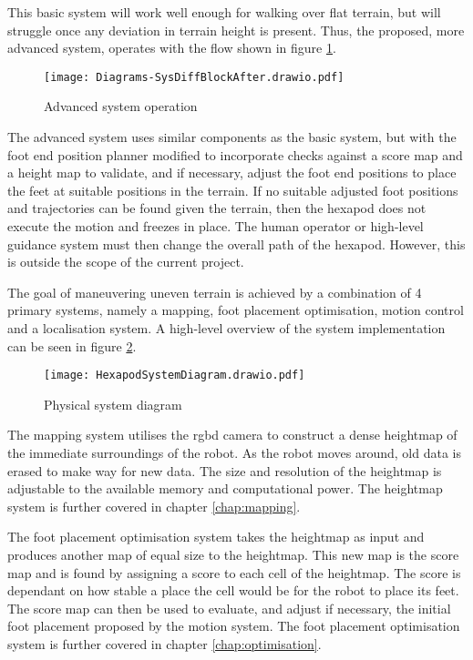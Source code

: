 \noindent
This basic system will work well enough for walking over flat terrain, but will struggle once any
deviation in terrain height is present. Thus, the proposed, more advanced system, operates with the flow shown in figure \ref{fig:adv_sys}.
\begin{figure}[h]
    \centering
    \texttt{[image: Diagrams-SysDiffBlockAfter.drawio.pdf]}
    \caption{Advanced system operation}
    \label{fig:adv_sys}
\end{figure}

\noindent
The advanced system uses similar components as the basic system, but with the foot end position planner modified to incorporate
checks against a score map and a height map to validate, and if necessary, adjust the foot 
end positions to place the feet at suitable positions in the  terrain. If no suitable adjusted foot positions and trajectories
can be found given the terrain, then the hexapod does not execute the motion and freezes in place. The human operator or
high-level guidance system must then change the overall path of the hexapod. However, this is outside the scope of the current
project.

The goal of maneuvering uneven terrain is achieved by a combination of 4 primary systems, namely a mapping, 
foot placement optimisation, motion control and a localisation system. A high-level overview of the system implementation can be seen
in figure \ref{fig:system_diagram}.
\begin{figure}[h]
    \centering
    \texttt{[image: HexapodSystemDiagram.drawio.pdf]}
    \caption{Physical system diagram}
    \label{fig:system_diagram}
\end{figure}

The mapping system utilises the \ac*{rgbd} camera to construct a dense heightmap of the immediate surroundings of the robot. As the robot moves around, old data is erased to make way for new data. The size and resolution of the heightmap is adjustable to the available memory and computational power. The heightmap system is further covered in chapter \ref{chap:mapping}.

The foot placement optimisation system takes the heightmap as input and produces another map of equal size to the heightmap. This new map is the score map and is found by assigning a score to each cell of the heightmap. The score is dependant on how stable a place the cell would be for the robot to place its feet. The score map can then be used to evaluate, and adjust if necessary, the initial foot placement proposed by the motion system. The foot placement optimisation system is further covered in chapter \ref{chap:optimisation}.

